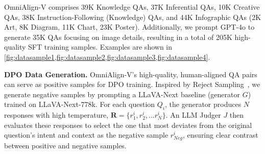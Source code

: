 OmniAlign-V comprises 39K Knowledge QAs, 37K Inferential QAs, 10K Creative QAs, 
38K Instruction-Following (Knowledge) QAs, and 44K Infographic QAs (2K Art, 8K Diagram, 11K Chart, 23K Poster). 
Additionally, we prompt GPT-4o to generate 35K QAs focusing on image details, resulting in a total of 205K high-quality SFT training samples. Examples are shown in \cref{fig:datasample1,fig:datasample2,fig:datasample3,fig:datasample4}.




\noindent\textbf{DPO Data Generation. } 
OmniAlign-V's high-quality, human-aligned QA pairs can serve as positive samples for DPO training. 
Inspired by Reject Sampling~\cite{casella2004generalized}, 
we generate negative samples by prompting a LLaVA-Next baseline (generator $G$) trained on LLaVA-Next-778k. 
For each question $Q_i$, the generator produces $N$ responses with high temperature,
$\mathbf{R} = \{r^i_1, r^i_2,... r^i_N\}$. An LLM Judger $J$ then evaluates these responses to select the one that most  deviates from the original question's intent and context as the negative sample $r^i_{Neg}$, ensuring clear contrast between positive and negative samples.




